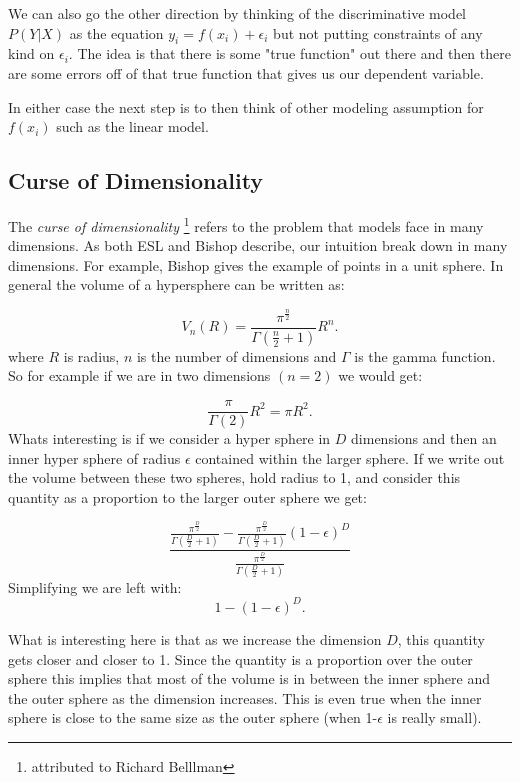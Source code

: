 We can also go the other direction by thinking of the discriminative model $P(Y|X)$ as the equation $y_i = f(x_i) + \epsilon_i$ but not putting constraints of any kind on $\epsilon_i$. The idea is that there is some "true function" out there and then there are some errors off of that true function that gives us our dependent variable.

In either case the next step is to then think of other modeling assumption for $f(x_i)$ such as the linear model.


\subsection{Curse of Dimensionality}

The \emph{curse of dimensionality}  \footnote{attributed to Richard Belllman} refers to the problem that models face in many dimensions. As both ESL and Bishop describe, our intuition break down in many dimensions. For example, Bishop gives the example of points in a unit sphere. In general the volume of a hypersphere can be written as:

\begin{equation}
V_n(R) = \frac{\pi^{\frac{n}{2}}}{\Gamma(\frac{n}{2} + 1)}R^n.
\end{equation}
where $R$ is radius, $n$ is the number of dimensions and $\Gamma$ is the \gls{gamma} function. So for example if we are in two dimensions $(n=2)$ we would get:

\begin{equation}
\frac{\pi}{\Gamma(2)}R^2 = \pi R^2.
\end{equation}
Whats interesting is if we consider a hyper sphere in $D$ dimensions and then an inner hyper sphere of radius $\epsilon$ contained within the larger sphere. If we write out the volume between these two spheres, hold radius to 1, and consider this quantity as a proportion to the larger outer sphere we get:

\begin{equation}
\frac{\frac{\pi^{\frac{D}{2}}}{\Gamma(\frac{D}{2} + 1)} - \frac{\pi^{\frac{D}{2}}}{\Gamma(\frac{D}{2} + 1)} (1-\epsilon)^{D}}{\frac{\pi^{\frac{D}{2}}}{\Gamma(\frac{D}{2} + 1)}}
\end{equation}
Simplifying we are left with:
\begin{equation}
1 - (1-\epsilon)^D.
\end{equation}

What is interesting here is that as we increase the dimension $D$, this quantity gets closer and closer to 1. Since the quantity is a proportion over the outer sphere this implies that most of the volume is in between the inner sphere and the outer sphere as the dimension increases. This is even true when the inner sphere is close to the same size as the outer sphere (when 1-$\epsilon$ is really small).

